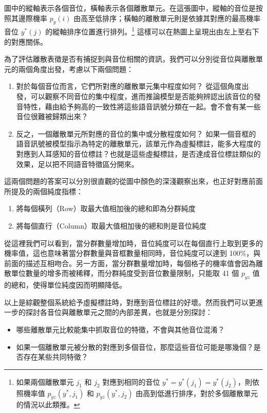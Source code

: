 {        圖中的縱軸表示各個音位，橫軸表示各個離散單元。在這張圖中，縱軸的音位是按照其邊際機率 \(p_y(i)\) 由高至低排序；橫軸的離散單元則是依據其對應的最高機率音位 \(y^\ast(j)\) 的縱軸排序位置進行排列。\footnote{如果兩個離散單元 \(j_1\) 和 \(j_2\) 對應到相同的音位 \(y^\ast = y^\ast(j_1) = y^\ast(j_2)\)，則依照機率值 \(p_{yz}(y^\ast, j_1)\) 和 \(p_{yz}(y^\ast, j_2)\) 由高到低進行排序，對於多個離散單元的情況以此類推。} 這樣可以在熱圖上呈現出由左上至右下的對應關係。

        為了評估離散表徵是否有捕捉到與音位相關的資訊，我們可以分別從音位與離散單元的兩個角度出發，考慮以下兩個問題：
\begin{enumerate}
    \item 對於每個音位而言，它們所對應的離散單元集中程度如何？
從這個角度出發，可以觀察不同音位的集中程度，進而推論模型是否能夠辨認出該音位的發音特性，藉由給予夠高的一致性將這些語音訊號分類在一起。會不會有某一些音位很難被歸類出來？
    \item 反之，一個離散單元所對應的音位的集中或分散程度如何？
如果一個音框的語音訊號被模型指示為特定的離散單元，該單元作為虛擬標註，能多大程度的對應到人耳感知的音位標註？也就是這些虛擬標註，是否達成音位標註類似的效果，足以把不同語音特徵區分開來。
\end{enumerate}

        這兩個問題的答案可以分別很直觀的從圖中顏色的深淺觀察出來，也正好對應前面所提及的兩個純度指標：
        \begin{enumerate}
            \item 將每個橫列（Row）取最大值相加後的總和即為分群純度
            \item 將每個直行（Column）取最大值相加後的總和則是音位純度
        \end{enumerate}

        從這裡我們可以看到，當分群數量增加時，音位純度可以在每個直行上取到更多的機率值，這也意味著當分群數量與音框數量相同時，音位純度可以達到 100\%，與前面的描述互相吻合。另一方面，當分群數量增加時，每個格子的機率值會因為離散單位數量的增多而被稀釋，而分群純度受到音位數量限制，只能取 41 個 $p_{yz}$ 值的總和，使得單位純度因而明顯降低。

        以上是綜觀整個系統給予虛擬標註時，對應到音位標註的好壞。然而我們可以更進一步的探討各音位與離散單元之間的內部差異，也就是分別探討：
\begin{itemize}
    \item 哪些離散單元比較能集中抓取音位的特徵，不會與其他音位混淆？
    \item 如果一個離散單元被分散的對應到多個音位，那麼這些音位可能是哪幾個？是否存在某些共同特徵？
\end{itemize}

}
